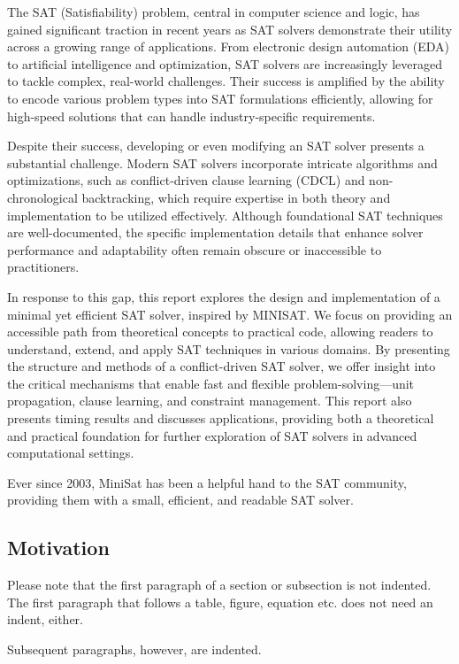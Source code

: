 \documentclass[runningheads]{llncs}
\begin{document}
The SAT (Satisfiability) problem, central in computer science and logic, has gained significant traction in recent years as SAT solvers demonstrate their utility across a growing range of applications. From electronic design automation (EDA) to artificial intelligence and optimization, SAT solvers are increasingly leveraged to tackle complex, real-world challenges. Their success is amplified by the ability to encode various problem types into SAT formulations efficiently, allowing for high-speed solutions that can handle industry-specific requirements.

Despite their success, developing or even modifying an SAT solver presents a substantial challenge. Modern SAT solvers incorporate intricate algorithms and optimizations, such as conflict-driven clause learning (CDCL) and non-chronological backtracking, which require expertise in both theory and implementation to be utilized effectively. Although foundational SAT techniques are well-documented, the specific implementation details that enhance solver performance and adaptability often remain obscure or inaccessible to practitioners.

In response to this gap, this report explores the design and implementation of a minimal yet efficient SAT solver, inspired by MINISAT. We focus on providing an accessible path from theoretical concepts to practical code, allowing readers to understand, extend, and apply SAT techniques in various domains. By presenting the structure and methods of a conflict-driven SAT solver, we offer insight into the critical mechanisms that enable fast and flexible problem-solving—unit propagation, clause learning, and constraint management. This report also presents timing results and discusses applications, providing both a theoretical and practical foundation for further exploration of SAT solvers in advanced computational settings.

Ever since 2003, MiniSat has been a helpful hand to the SAT community, providing them with a small, efficient, and readable SAT solver. 

\subsection{Motivation}
Please note that the first paragraph of a section or subsection is
not indented. The first paragraph that follows a table, figure,
equation etc. does not need an indent, either.

Subsequent paragraphs, however, are indented.
\end{document}
